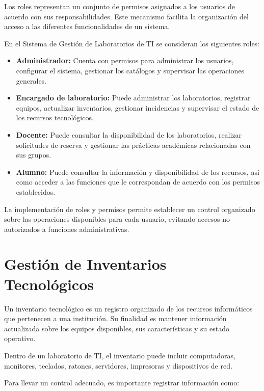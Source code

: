 Los roles representan un conjunto de permisos asignados a los usuarios de acuerdo con sus responsabilidades. Este mecanismo facilita la organización del acceso a las diferentes funcionalidades de un sistema.

En el Sistema de Gestión de Laboratorios de TI se consideran los siguientes roles:

\begin{itemize}

    \item \textbf{Administrador:} Cuenta con permisos para administrar los usuarios, configurar el sistema, gestionar los catálogos y supervisar las operaciones generales.

    \item \textbf{Encargado de laboratorio:} Puede administrar los laboratorios, registrar equipos, actualizar inventarios, gestionar incidencias y supervisar el estado de los recursos tecnológicos.

    \item \textbf{Docente:} Puede consultar la disponibilidad de los laboratorios, realizar solicitudes de reserva y gestionar las prácticas académicas relacionadas con sus grupos.

    \item \textbf{Alumno:} Puede consultar la información y disponibilidad de los recursos, así como acceder a las funciones que le correspondan de acuerdo con los permisos establecidos.

\end{itemize}

La implementación de roles y permisos permite establecer un control organizado sobre las operaciones disponibles para cada usuario, evitando accesos no autorizados a funciones administrativas.

\section{Gestión de Inventarios Tecnológicos}

Un inventario tecnológico es un registro organizado de los recursos informáticos que pertenecen a una institución. Su finalidad es mantener información actualizada sobre los equipos disponibles, sus características y su estado operativo.

Dentro de un laboratorio de TI, el inventario puede incluir computadoras, monitores, teclados, ratones, servidores, impresoras y dispositivos de red.

Para llevar un control adecuado, es importante registrar información como:

